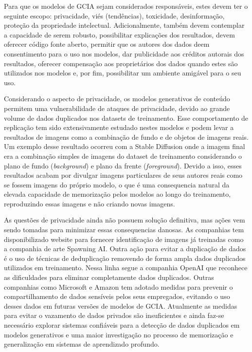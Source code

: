 Para que os modelos de GCIA sejam considerados responsáveis, estes devem ter o seguinte escopo: 
privacidade, viés (tendências), toxicidade, desinformação, proteção da propriedade intelectual. 
Adicionalmente, também devem contemplar a capacidade de serem robusto, possibilitar explicações dos resultados,
devem oferecer código fonte aberto, permitir que os autores dos dados deem consentimento para o uso nos modelos, 
dar publicidade aos créditos autorais dos resultados, oferecer compensação aos proprietários dos dados quando 
estes são utilizados nos modelos e, por fim, possibilitar um ambiente amigável para o seu uso.

Considerando o aspecto de privacidade, os modelos generativos de conteúdo permitem uma vulnerabilidade de ataques de privacidade,
devido ao grande volume de dados duplicados nos datasets de treinamento. 
Esse comportamento de replicação tem sido extensivamente estudado nestes modelos e podem levar 
a resultados de imagens como a combinação de fundo e de objetos de imagens reais. Um exemplo desse resultado 
ocorreu com a Stable Diffusion onde a imagem  final era a combinação simples de imagens do dataset de treinamento 
considerando o plano de fundo (\textit{background}) e plano da frente (\textit{foreground}). Devido a isso, 
esses resultados acabam por divulgar imagens particulares de seus autores reais como se fossem 
imagens do próprio modelo, o que é uma consequencia natural da elevada capacidade de memorização pelos modelos ao longo
do treinamento, reproduzindo essas imagens e não criando novas imagens.

As questões de privacidade ainda não possuem solução definitiva, mas ações vem sendo tomadas para minimizar essas consequencias 
danosas. As companhias tem disponibilizado website para fornecer identificação de imagens já treinadas como a 
companhia de arte Spawning AI. 
Outra ação para evitar a duplicação de dados é o uso de técnicas de deduplicação removendo de forma ampla dados
duplicados utilizados em treinamento. Nessa linha segue a companhia OpenAI que reconhece as dificuldades para eliminar 
completamente dados duplicados. 
Outras companhias como Microsoft e Amazon tem adotado medidas para prevenir o compartilhamento de dados sensíveis pelos seus empregados, 
evitando o uso desses dados em futuras versões de modelos de GCIA.
Atualmente as medidas para evitar o vazamento de dados privados são insuficientes e 
ainda faz-se necessário explorar sistemas confiáveis para a detecção de dados duplicados em modelos generativos e uma 
maior investigação no processo de memorização e generalização em sistemas de aprendizado profundo.

